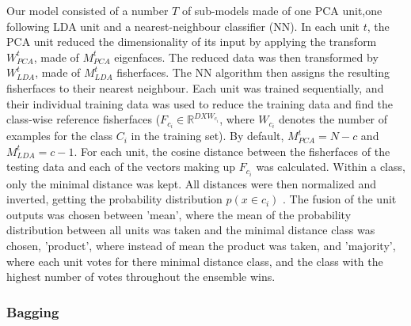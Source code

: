 \documentclass[10pt,technote]{IEEEtran}
\begin{document}
Our model consisted of a number $T$ of sub-models made of one PCA unit,one following LDA unit and a nearest-neighbour classifier (NN). In each unit $t$, the PCA unit reduced the dimensionality of its input by applying the transform $W_{PCA}^t$, made of $M_{PCA}^t$ eigenfaces. The reduced data was then transformed by $W_{LDA}^t$, made of $M_{LDA}^t$ fisherfaces. The NN algorithm then assigns the resulting fisherfaces to their nearest neighbour. Each unit was trained sequentially, and their individual training data was used to reduce the training data and find the class-wise reference fisherfaces ($F_{c_i} \in \mathbb{R}^{D X W_{c_i}}$, where $W_{c_i}$ denotes the number of examples for the class $C_i$ in the training set).  By default, $M_{PCA}^t = N - c$ and $M_{LDA}^t = c - 1$. For each unit,  the cosine distance between the fisherfaces of the testing data and each of the vectors making up $F_{c_i}$ was calculated. Within a class, only the minimal distance was kept. All distances were then normalized and inverted, getting the probability distribution $p(x \in c_i)$ . The fusion of the unit outputs was chosen between 'mean', where the mean of the probability distribution between all units was taken and the minimal distance class was chosen, 'product', where instead of mean the product was taken, and 'majority', where each unit votes for there minimal distance class, and the class with the highest number of votes throughout the ensemble wins.

\subsubsection{Bagging}
\end{document}
